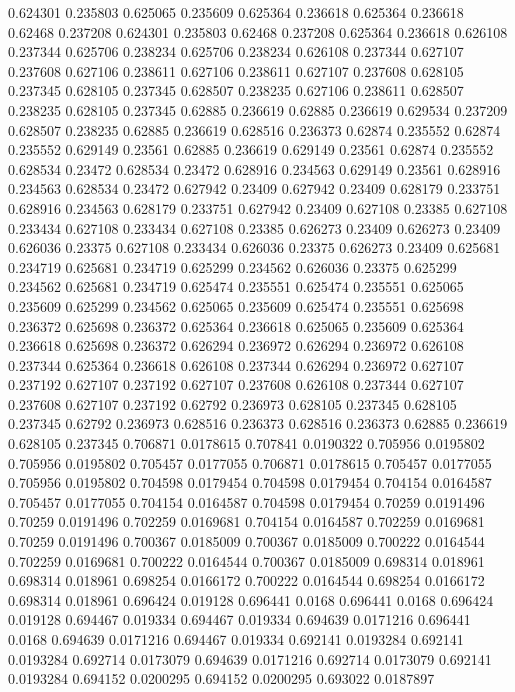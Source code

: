 0.624301 0.235803
0.625065 0.235609
0.625364 0.236618
0.625364 0.236618
0.62468 0.237208
0.624301 0.235803
0.62468 0.237208
0.625364 0.236618
0.626108 0.237344
0.625706 0.238234
0.625706 0.238234
0.626108 0.237344
0.627107 0.237608
0.627106 0.238611
0.627106 0.238611
0.627107 0.237608
0.628105 0.237345
0.628105 0.237345
0.628507 0.238235
0.627106 0.238611
0.628507 0.238235
0.628105 0.237345
0.62885 0.236619
0.62885 0.236619
0.629534 0.237209
0.628507 0.238235
0.62885 0.236619
0.628516 0.236373
0.62874 0.235552
0.62874 0.235552
0.629149 0.23561
0.62885 0.236619
0.629149 0.23561
0.62874 0.235552
0.628534 0.23472
0.628534 0.23472
0.628916 0.234563
0.629149 0.23561
0.628916 0.234563
0.628534 0.23472
0.627942 0.23409
0.627942 0.23409
0.628179 0.233751
0.628916 0.234563
0.628179 0.233751
0.627942 0.23409
0.627108 0.23385
0.627108 0.233434
0.627108 0.233434
0.627108 0.23385
0.626273 0.23409
0.626273 0.23409
0.626036 0.23375
0.627108 0.233434
0.626036 0.23375
0.626273 0.23409
0.625681 0.234719
0.625681 0.234719
0.625299 0.234562
0.626036 0.23375
0.625299 0.234562
0.625681 0.234719
0.625474 0.235551
0.625474 0.235551
0.625065 0.235609
0.625299 0.234562
0.625065 0.235609
0.625474 0.235551
0.625698 0.236372
0.625698 0.236372
0.625364 0.236618
0.625065 0.235609
0.625364 0.236618
0.625698 0.236372
0.626294 0.236972
0.626294 0.236972
0.626108 0.237344
0.625364 0.236618
0.626108 0.237344
0.626294 0.236972
0.627107 0.237192
0.627107 0.237192
0.627107 0.237608
0.626108 0.237344
0.627107 0.237608
0.627107 0.237192
0.62792 0.236973
0.628105 0.237345
0.628105 0.237345
0.62792 0.236973
0.628516 0.236373
0.628516 0.236373
0.62885 0.236619
0.628105 0.237345
0.706871 0.0178615
0.707841 0.0190322
0.705956 0.0195802
0.705956 0.0195802
0.705457 0.0177055
0.706871 0.0178615
0.705457 0.0177055
0.705956 0.0195802
0.704598 0.0179454
0.704598 0.0179454
0.704154 0.0164587
0.705457 0.0177055
0.704154 0.0164587
0.704598 0.0179454
0.70259 0.0191496
0.70259 0.0191496
0.702259 0.0169681
0.704154 0.0164587
0.702259 0.0169681
0.70259 0.0191496
0.700367 0.0185009
0.700367 0.0185009
0.700222 0.0164544
0.702259 0.0169681
0.700222 0.0164544
0.700367 0.0185009
0.698314 0.018961
0.698314 0.018961
0.698254 0.0166172
0.700222 0.0164544
0.698254 0.0166172
0.698314 0.018961
0.696424 0.019128
0.696441 0.0168
0.696441 0.0168
0.696424 0.019128
0.694467 0.019334
0.694467 0.019334
0.694639 0.0171216
0.696441 0.0168
0.694639 0.0171216
0.694467 0.019334
0.692141 0.0193284
0.692141 0.0193284
0.692714 0.0173079
0.694639 0.0171216
0.692714 0.0173079
0.692141 0.0193284
0.694152 0.0200295
0.694152 0.0200295
0.693022 0.0187897

